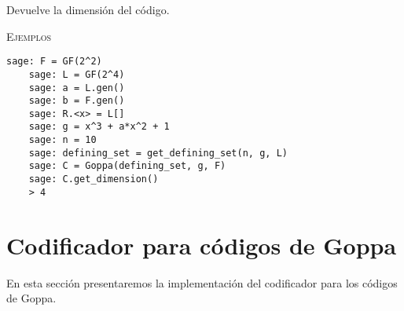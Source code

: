 \begin{description}[leftmargin=1em, font=\normalfont\ttfamily, style=nextline]
\begin{description}[font=\ttfamily, style=nextline]
  \item[get\_dimension(self)] Devuelve la dimensión del código.

  \textsc{Ejemplos}
  \begin{lstlisting}[gobble=4]
    sage: F = GF(2^2)
    sage: L = GF(2^4)
    sage: a = L.gen()
    sage: b = F.gen()
    sage: R.<x> = L[]
    sage: g = x^3 + a*x^2 + 1
    sage: n = 10
    sage: defining_set = get_defining_set(n, g, L)
    sage: C = Goppa(defining_set, g, F)
    sage: C.get_dimension()
    > 4
  \end{lstlisting}
  \end{description}
\end{description}

\section{Codificador para códigos de Goppa}

En esta sección presentaremos la implementación del codificador para los códigos de Goppa.

